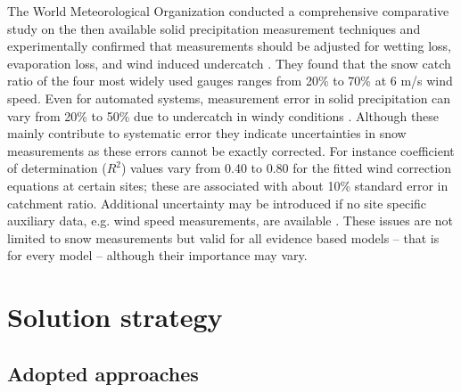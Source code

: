 The World Meteorological Organization conducted a comprehensive comparative study on the then available solid precipitation measurement techniques and experimentally confirmed that measurements should be adjusted for wetting loss, evaporation loss, and wind induced undercatch \citep{Goodison1998}. They found that the snow catch ratio of the four most widely used gauges ranges from 20\% to 70\% at 6 m/s wind speed. Even for automated systems, measurement error in solid precipitation can vary from 20\% to 50\% due to undercatch in windy conditions \citep{Rasmussen2012}. Although these mainly contribute to systematic error they indicate uncertainties in snow measurements as these errors cannot be exactly corrected. For instance coefficient of determination ($R^2$) values vary from 0.40 to 0.80 for the fitted wind correction equations at certain sites; these are associated with about 10\% standard error in catchment ratio. Additional uncertainty may be introduced if no site specific auxiliary data, e.g. wind speed measurements, are available \citep{Goodison1998}. These issues are not limited to snow measurements but valid for all evidence based models -- that is for every model -- although their importance may vary.

\section{Solution strategy}
\subsection{Adopted approaches}

